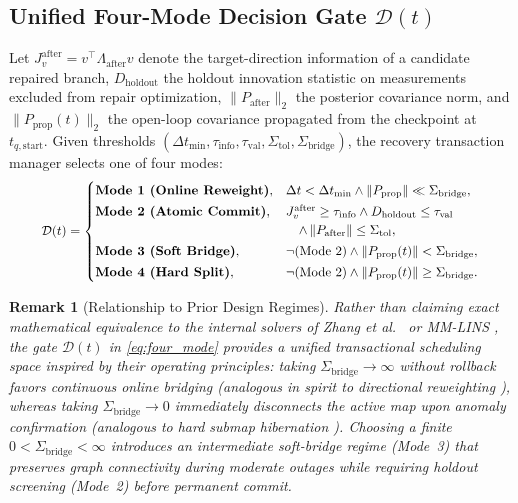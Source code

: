 \documentclass[journal]{IEEEtran}
\newtheorem{remark}{Remark}
\begin{document}
\subsection{Unified Four-Mode Decision Gate \texorpdfstring{$\mathcal{D}(t)$}{D(t)}}
Let $J_v^{\mathrm{after}} = v^\top \Lambda_{\mathrm{after}} v$ denote the target-direction information of a candidate repaired branch, $D_{\mathrm{holdout}}$ the holdout innovation statistic on measurements excluded from repair optimization, $\|P_{\mathrm{after}}\|_2$ the posterior covariance norm, and $\|P_{\mathrm{prop}}(t)\|_2$ the open-loop covariance propagated from the checkpoint at $t_{q,\mathrm{start}}$. Given thresholds $(\Delta t_{\min}, \tau_{\mathrm{info}}, \tau_{\mathrm{val}}, \Sigma_{\mathrm{tol}}, \Sigma_{\mathrm{bridge}})$, the recovery transaction manager selects one of four modes:
\begin{equation}
\resizebox{0.91\columnwidth}{!}{$
\mathcal{D}(t) = \begin{cases}
\textbf{Mode 1 (Online Reweight)}, & \Delta t < \Delta t_{\min} \wedge \|P_{\mathrm{prop}}\| \ll \Sigma_{\mathrm{bridge}}, \\[2pt]
\textbf{Mode 2 (Atomic Commit)}, & J_v^{\mathrm{after}} \ge \tau_{\mathrm{info}} \wedge D_{\mathrm{holdout}} \le \tau_{\mathrm{val}} \\
                                 & \quad \wedge\, \|P_{\mathrm{after}}\| \le \Sigma_{\mathrm{tol}}, \\[2pt]
\textbf{Mode 3 (Soft Bridge)}, & \neg(\text{Mode 2}) \wedge \|P_{\mathrm{prop}}(t)\| < \Sigma_{\mathrm{bridge}}, \\[2pt]
\textbf{Mode 4 (Hard Split)}, & \neg(\text{Mode 2}) \wedge \|P_{\mathrm{prop}}(t)\| \ge \Sigma_{\mathrm{bridge}}.
\end{cases}
$}
\label{eq:four_mode}
\end{equation}

\begin{remark}[Relationship to Prior Design Regimes]
Rather than claiming exact mathematical equivalence to the internal solvers of Zhang et al.\ \cite{zhang2016degeneracy} or MM-LINS \cite{ma2025mmlins}, the gate $\mathcal{D}(t)$ in \eqref{eq:four_mode} provides a unified transactional scheduling space inspired by their operating principles: taking $\Sigma_{\mathrm{bridge}} \to \infty$ without rollback favors continuous online bridging (analogous in spirit to directional reweighting \cite{zhang2016degeneracy}), whereas taking $\Sigma_{\mathrm{bridge}} \to 0$ immediately disconnects the active map upon anomaly confirmation (analogous to hard submap hibernation \cite{ma2025mmlins,campos2021orbslam3}). Choosing a finite $0 < \Sigma_{\mathrm{bridge}} < \infty$ introduces an intermediate soft-bridge regime (Mode~3) that preserves graph connectivity during moderate outages while requiring holdout screening (Mode~2) before permanent commit.
\end{remark}
\end{document}
